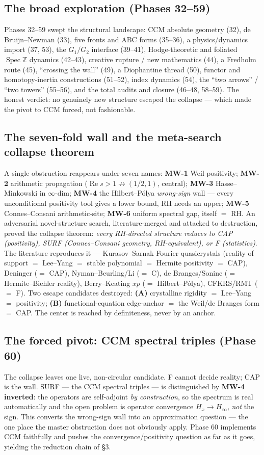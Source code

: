\documentclass[11pt]{article}
\theoremstyle{remark}
\begin{document}
\subsection{The broad exploration (Phases 32--59)}
Phases 32--59 swept the structural landscape: CCM absolute geometry (32), de Bruijn--Newman
(33), five fronts and ABC forms (35--36), a physics/dynamics import (37, 53), the $G_1/G_2$
interface (39--41), Hodge-theoretic and foliated $\operatorname{Spec}\mathbb Z$ dynamics
(42--43), creative rupture / new mathematics (44), a Fredholm route (45), ``crossing the wall''
(49), a Diophantine thread (50), functor and homotopy-inertia constructions (51--52), index
dynamics (54), the ``two arrows'' / ``two towers'' (55--56), and the total audits and closure
(46--48, 58--59). The honest verdict: no genuinely new structure escaped the collapse --- which
made the pivot to CCM forced, not fashionable.

\subsection{The seven-fold wall and the meta-search collapse theorem}
A single obstruction reappears under seven names: \textbf{MW-1} Weil positivity; \textbf{MW-2}
arithmetic propagation ($\operatorname{Re}s>1\not\to(1/2,1)$, central); \textbf{MW-3}
Hasse--Minkowski in $\infty$-dim; \textbf{MW-4} the Hilbert--P\'olya \emph{wrong-sign} wall ---
every unconditional positivity tool gives a lower bound, RH needs an upper; \textbf{MW-5}
Connes--Consani arithmetic-site; \textbf{MW-6} uniform spectral gap, itself $=$ RH. An
adversarial novel-structure search, literature-merged and attacked to destruction, proved the
collapse theorem: \emph{every RH-directed structure reduces to CAP (positivity), SURF
(Connes--Consani geometry, RH-equivalent), or F (statistics)}. The literature reproduces it ---
Kurasov--Sarnak Fourier quasicrystals (reality of support $=$ Lee--Yang $=$ stable polynomial
$=$ Hermite positivity $=$ CAP), Deninger ($=$ CAP), Nyman--Beurling/Li ($=$ C), de
Branges/Sonine ($=$ Hermite--Biehler reality), Berry--Keating $xp$ ($=$ Hilbert--P\'olya),
CFKRS/RMT ($=$ F). Two escape candidates destroyed: \textbf{(A)} crystalline rigidity $=$
Lee--Yang $=$ positivity; \textbf{(B)} functional-equation edge-anchor $=$ the Weil/de Branges
form $=$ CAP. The center is reached by definiteness, never by an anchor.

\subsection{The forced pivot: CCM spectral triples (Phase 60)}
The collapse leaves one live, non-circular candidate. F cannot decide reality; CAP is the wall.
SURF --- the CCM spectral triples --- is distinguished by \textbf{MW-4 inverted}: the operators
are self-adjoint \emph{by construction}, so the spectrum is real automatically and the open
problem is operator convergence $H_x\to H_\infty$, \emph{not} the sign. This converts the
wrong-sign wall into an approximation question --- the one place the master obstruction does not
obviously apply. Phase 60 implements CCM faithfully and pushes the convergence/positivity
question as far as it goes, yielding the reduction chain of \S3.
\end{document}
